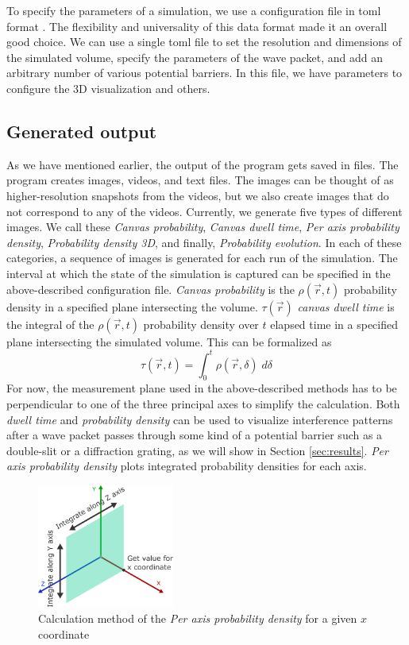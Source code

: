 To specify the parameters of a simulation, we use a configuration file in \acrfull{toml} format \cite{toml}.
The flexibility and universality of this data format made it an overall good choice.
We can use a single \acrshort{toml} file to set the resolution and dimensions of the simulated volume, specify the parameters of the wave packet, and add an arbitrary number of various potential barriers.
In this file, we have parameters to configure the 3D visualization and others.

\subsection{Generated output}

As we have mentioned earlier, the output of the program gets saved in files.
The program creates images, videos, and text files.
The images can be thought of as higher-resolution snapshots from the videos, but we also create images that do not correspond to any of the videos.
Currently, we generate five types of different images.
We call these \textit{Canvas probability}, \textit{Canvas dwell time}, \textit{Per axis probability density}, \textit{Probability density 3D}, and finally, \textit{Probability evolution}.
In each of these categories, a sequence of images is generated for each run of the simulation.
The interval at which the state of the simulation is captured can be specified in the above-described configuration file.
\textit{Canvas probability} is the $\rho(\vec{r}, t)$ probability density in a specified plane intersecting the volume.
$\tau (\vec{r})$ \textit{canvas dwell time} is the integral of the $\rho(\vec{r}, t)$ probability density over $t$ elapsed time in a specified plane intersecting the simulated volume.
This can be formalized as
\begin{equation}
	\tau (\vec{r}, t) = \int_0^t \rho(\vec{r}, \delta)\; d\delta
	\label{eq:dwell_time}
\end{equation}
For now, the measurement plane used in the above-described methods has to be perpendicular to one of the three principal axes to simplify the calculation.
Both \textit{dwell time} and \textit{probability density} can be used to visualize interference patterns after a wave packet passes through some kind of a potential barrier such as a double-slit or a diffraction grating, as we will show in Section \ref{sec:results}.
\textit{Per axis probability density} plots integrated probability densities for each axis.
\begin{figure}[H]
	\centering
	\includegraphics[width=0.4\textwidth]{figures/per_axis_plot_explained.pdf}
	\caption{Calculation method of the \textit{Per axis probability density} for a given $x$ coordinate}
	\label{fig:per_axis_explained}
\end{figure}
